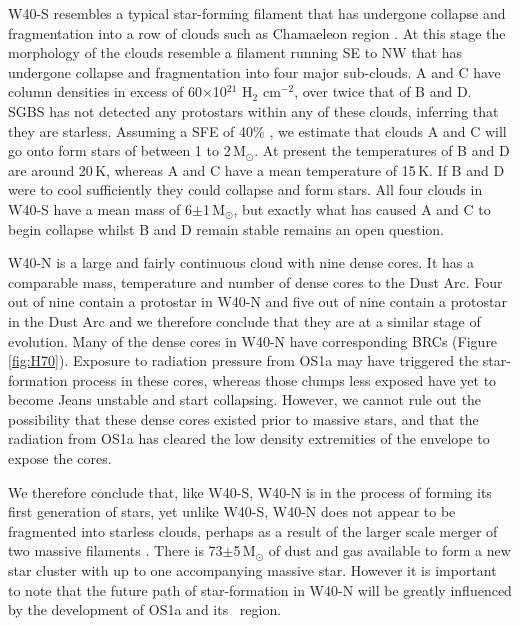 W40-S resembles a typical star-forming filament that has undergone collapse and 
fragmentation into a row of clouds such as Chamaeleon region \citep{Boulanger:1998fk, 
Young:2005ly, Belloche:2011fk}. At this stage the morphology of the clouds resemble 
a filament running SE to NW that has undergone collapse and fragmentation into four 
major sub-clouds. A and C have column densities in excess of 60$\times$10$^{21}$ 
H$_{2}$ cm$^{-2}$, over twice that of B and D. SGBS has not detected any protostars 
within any of these clouds, inferring that they are starless. Assuming a SFE of 40\% 
\citep{Konyves:2015uq}, we estimate that clouds A and C will go onto form stars of 
between 1 to 2\,M$_{\odot}$. At present the temperatures of B and D are around 20\,K, 
whereas A and C have a mean temperature of 15\,K. If B and D were to cool sufficiently 
they could collapse and form stars. All four clouds in W40-S have a mean mass of 
6$\pm$1\,M$_{\odot}$, but exactly what has caused A and C to begin collapse 
whilst B and D remain stable remains an open question.

W40-N is a large and fairly continuous cloud with nine dense cores. It has a comparable 
mass, temperature and number of dense cores to the Dust Arc. Four out of nine contain 
a protostar in W40-N and five out of nine contain a protostar in the Dust Arc and we 
therefore conclude that they are at a similar stage of evolution. Many of the dense cores 
in W40-N have corresponding BRCs (Figure \ref{fig:H70}). Exposure to radiation pressure 
from OS1a may have triggered the star-formation process in these cores, whereas those 
clumps less exposed have yet to become Jeans unstable and start collapsing. However, 
we cannot rule out the possibility that these dense cores existed prior to massive stars, 
and that the radiation from OS1a has cleared the low density extremities of the envelope 
to expose the cores. 

We therefore conclude that, like W40-S, W40-N is in the process of forming its first 
generation of stars, yet unlike W40-S, W40-N does not appear to be fragmented into 
starless clouds, perhaps as a result of the larger scale merger of two massive filaments 
\citep{Mallick:2013kx}. There is 73$\pm$5\,M$_{\odot}$ of dust and gas available to form 
a new star cluster with up to one accompanying massive star. However it is important to 
note that the future path of star-formation in W40-N will be greatly influenced by the 
development of OS1a and its \HII\ region.

